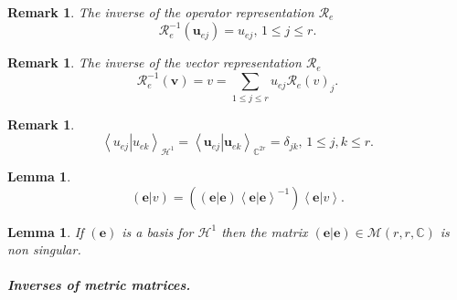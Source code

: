 \documentclass[aps,preprint]{revtex4}%
\newtheorem{lemma}[theorem]{Lemma}
\newtheorem{remark}[theorem]{Remark}
\begin{document}
\begin{remark}
The inverse of the \emph{operator} representation $\mathcal{R}_{e}$
\begin{equation}
\mathcal{R}_{e}^{-1}\left(  \mathbf{u}_{ej}\right)  =u_{ej},\,1\leq j\leq r.
\end{equation}

\end{remark}

\begin{remark}
The inverse of the \emph{vector} representation $\mathcal{R}_{e}$%
\begin{equation}
\mathcal{R}_{e}^{-1}\left(  \mathbf{v}\right)  =v=\sum_{1\leq j\leq r}%
u_{ej}\mathcal{R}_{e}\left(  v\right)  _{j}.
\end{equation}

\end{remark}

\begin{remark}%
\begin{equation}
\left\langle \left.  u_{ej}\right\vert u_{ek}\right\rangle _{\mathcal{H}^{1}%
}=\left\langle \left.  \mathbf{u}_{ej}\right\vert \mathbf{u}_{ek}\right\rangle
_{\mathbb{C}^{2r}}=\delta_{jk},\,1\leq j,k\leq r.
\end{equation}

\end{remark}

\begin{lemma}%
\begin{equation}
\left(  \left.  \mathbf{e}\right\vert v\right)  =\left(  \overset{}{\left(
\left.  \mathbf{e}\right\vert \mathbf{e}\right)  \left\langle \left.
\mathbf{e}\right\vert \mathbf{e}\right\rangle ^{-1}}\right)  \left\langle
\left.  \mathbf{e}\right\vert v\right\rangle .
\end{equation}

\end{lemma}

\begin{lemma}
If $\left(  \mathbf{e}\right)  $ is a basis for $\mathcal{H}^{1}$ then the
matrix $\left(  \left.  \mathbf{e}\right\vert \mathbf{e}\right)
\in\mathcal{M}\left(  r,r,\mathbb{C}\right)  $ is non singular.
\end{lemma}

\subparagraph{Inverses of metric matrices.}
\end{document}
